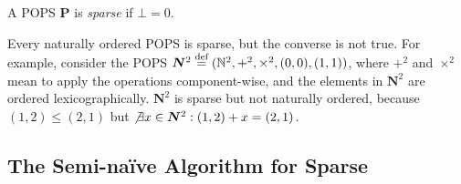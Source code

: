 
%
\begin{defn}
  \label{def:sparse}
  A POPS $\bm P$ is {\em sparse} if $\bot = 0$.
\end{defn}
%
Every naturally ordered POPS is sparse, but the converse is not true.
For example, 
 consider the POPS $\bm N^2 \stackrel{\text{def}}{=} (\mathbb N^2, +^2, \times^2, (0, 0), (1, 1))$,
 where $+^2$ and $\times^2$ mean to apply the operations component-wise,
 and the elements in $\bm N^2$ are ordered lexicographically.
$\bm N^2$ is sparse but not naturally ordered, 
 because $(1, 2) \leq (2, 1)$ but
 $\not \exists x \in {\bm N^2} : (1, 2) + x = (2, 1)$.



\subsection{The Semi-na\"ive Algorithm for Sparse \datalogo}
\label{sec:semi-naive-algorithm}

